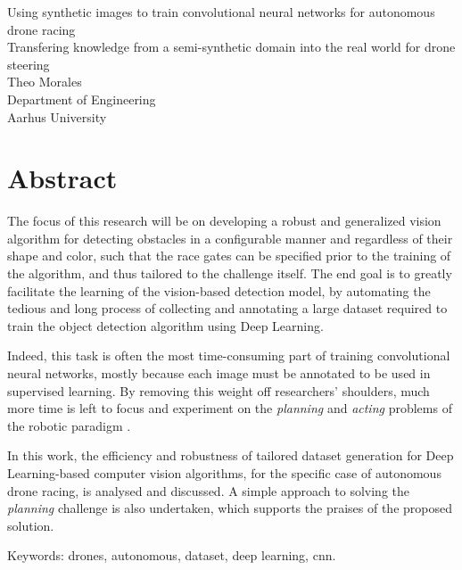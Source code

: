 Using synthetic images to train convolutional neural networks for autonomous
drone racing \\
Transfering knowledge from a semi-synthetic domain into the real world for drone
steering\\
Theo Morales\\
Department of Engineering\\
Aarhus University \setlength{\parskip}{0.5cm}

\thispagestyle{plain}			%
\setlength{\parskip}{0pt plus 1.0pt}
\section*{Abstract}
The focus of this research will be on developing a robust and generalized
vision algorithm for detecting obstacles in a configurable manner and regardless
of their shape and color, such that the race gates can be specified prior to the
training of the algorithm, and thus tailored to the challenge itself. The end
goal is to greatly facilitate the learning of the vision-based detection model,
by automating the tedious and long process of collecting and annotating a large
dataset required to train the object detection algorithm using Deep Learning.

Indeed, this task is often the most time-consuming part of training
convolutional neural networks, mostly because each image must be annotated to be
used in supervised learning. By removing this weight off researchers' shoulders,
much more time is left to focus and experiment on the \emph{planning} and
\emph{acting} problems of the robotic paradigm .

In this work, the efficiency and robustness of tailored dataset generation for
Deep Learning-based computer vision algorithms, for the specific case of
autonomous drone racing, is analysed and discussed.
A simple approach to solving the \emph{planning} challenge is also undertaken,
which supports the praises of the proposed solution.

\vfill
Keywords: drones, autonomous, dataset, deep learning, cnn.

